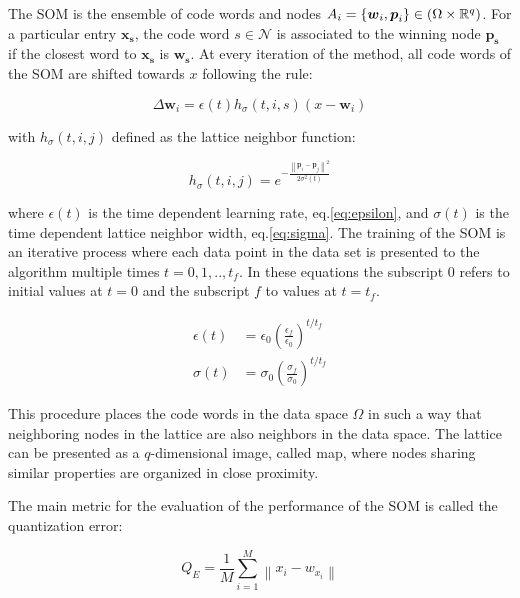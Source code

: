 The SOM is the ensemble of code words and nodes $A_i = \{ \boldsymbol{w}_i, \boldsymbol{p}_i\} \in (\Omega \times \Bbb R^q)$. For a particular entry $\boldsymbol{x_s}$, the code word $s \in \mathcal{N}$ is associated to the winning node $\boldsymbol{p_s}$ if the closest word to $\boldsymbol{x_s}$ is $\boldsymbol{w_s}$. At every iteration of the method, all code words of the SOM are shifted towards $x$ following the rule:

\begin{equation}
\Delta \boldsymbol{w}_i = \epsilon(t)h_\sigma(t,i,s)(x-\boldsymbol{w}_i) \label{eq:learnsom}
\end{equation}

with $h_\sigma(t,i,j)$ defined as the lattice neighbor function:

\begin{equation}
h_\sigma(t,i,j) = e^{-\frac{\left\lVert \boldsymbol{p}_i - \boldsymbol{p}_j \right\rVert^2}{2\sigma^2(t)}} \label{eq:neigsom}
\end{equation}

where $\epsilon(t)$ is the time dependent learning rate, eq.\eqref{eq:epsilon}, and $\sigma(t)$ is the time dependent lattice neighbor width, eq.\eqref{eq:sigma}. The training of the SOM is an iterative process where each data point in the data set is presented to the algorithm multiple times $t={0, 1,..,t_f}$. In these equations the subscript $0$ refers to initial values at $t=0$ and the subscript $f$ to values at $t=t_f$.

\begin{align}
\epsilon(t) & = \epsilon_0 \left(\frac{\epsilon_f}{\epsilon_0}\right)^{t/t_f} \label{eq:epsilon} \\
\sigma(t) & = \sigma_0 \left(\frac{\sigma_f}{\sigma_0}\right)^{t/t_f} \label{eq:sigma}
\end{align}

This procedure places the code words in the data space $\Omega$ in such a way that neighboring nodes in the lattice are also neighbors in the data space. The lattice can be presented as a $q$-dimensional image, called map, where nodes sharing similar properties are organized in close proximity.

The main metric for the evaluation of the performance of the SOM is called the quantization error:

\begin{equation}
Q_E = \frac{1}{M} \sum_{i=1}^M \left\lVert x_i - w_{x_i} \right\rVert
\end{equation}

